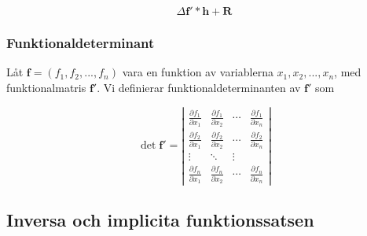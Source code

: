 \documentclass[a4paper,12pt]{article}
\begin{document}
\[
    \Delta \textbf{f}' * \textbf{h} + \textbf{R}
\]

\subsubsection*{Funktionaldeterminant}
Låt $\textbf{f} = (f_1, f_2, ..., f_n)$ vara en funktion av variablerna $x_1, x_2, ..., x_n$, med funktionalmatris $\textbf{f}'$.
Vi definierar funktionaldeterminanten av $\textbf{f}'$ som

\[
\det \mathbf{f}' = 
\left|
\begin{matrix}
\frac{\partial f_1}{\partial x_1} & \frac{\partial f_1}{\partial x_2} & \cdots & \frac{\partial f_1}{\partial x_n} \\
\frac{\partial f_2}{\partial x_1} & \frac{\partial f_2}{\partial x_2} & \cdots & \frac{\partial f_2}{\partial x_n} \\
\vdots & \ddots & \vdots \\
\frac{\partial f_n}{\partial x_1} & \frac{\partial f_n}{\partial x_2} & \cdots & \frac{\partial f_n}{\partial x_n}
\end{matrix}
\right|
\]



\subsection{Inversa och implicita funktionssatsen}
\end{document}

